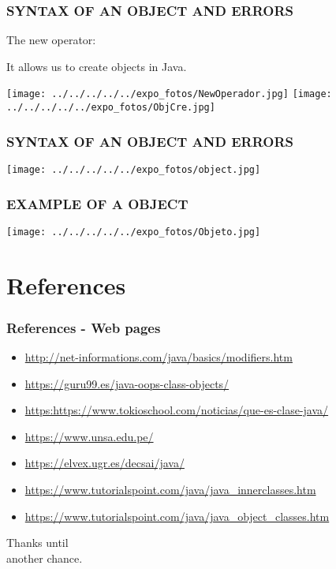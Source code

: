 \documentclass[11pt,a4paper]{beamer}
\begin{document}
\begin{frame}
\frametitle{SYNTAX OF AN OBJECT AND ERRORS}
The new operator:

It allows us to create objects in Java.
\begin{center}
\texttt{[image: ../../../../../expo\_fotos/NewOperador.jpg]} 
\texttt{[image: ../../../../../expo\_fotos/ObjCre.jpg]} 
\end{center}
\end{frame}

\begin{frame}
\frametitle{SYNTAX OF AN OBJECT AND ERRORS}
\begin{center}
\texttt{[image: ../../../../../expo\_fotos/object.jpg]} 
\end{center}
\end{frame}

\begin{frame}
\frametitle{EXAMPLE OF A OBJECT}
\begin{center}
\texttt{[image: ../../../../../expo\_fotos/Objeto.jpg]} 
\end{center}
\end{frame}

\section{References}
\begin{frame}
\frametitle{References - Web pages}
\begin{itemize}
\item \url{http://net-informations.com/java/basics/modifiers.htm}
\item \url{https://guru99.es/java-oops-class-objects/}
\item \url{https:https://www.tokioschool.com/noticias/que-es-clase-java/}
\item \url{https://www.unsa.edu.pe/}
\item \url{https://elvex.ugr.es/decsai/java/}
\item \url{https://www.tutorialspoint.com/java/java_innerclasses.htm}
\item \url{https://www.tutorialspoint.com/java/java_object_classes.htm}
\end{itemize}
\end{frame}

\begin{frame}
\begin{center}
Thanks until\\
another chance.
\end{center}
\end{frame}
\end{document}
